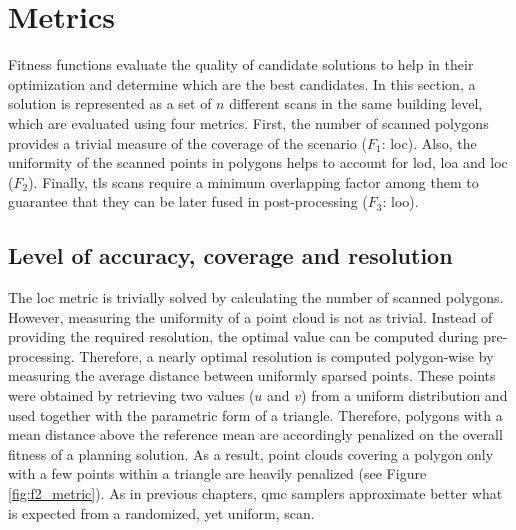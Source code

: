 \section{Metrics}

Fitness functions evaluate the quality of candidate solutions to help in their optimization and determine which are the best candidates. In this section, a solution is represented as a set of $n$ different scans in the same building level, which are evaluated using four metrics. First, the number of scanned polygons provides a trivial measure of the coverage of the scenario ($F_1$: \acrshort{loc}). Also, the uniformity of the scanned points in polygons helps to account for  \acrshort{lod}, \acrshort{loa} and \acrshort{loc} ($F_2$). Finally, \acrshort{tls} scans require a minimum overlapping factor among them to guarantee that they can be later fused in post-processing ($F_3$: \acrshort{loo}). 

\subsection{Level of accuracy, coverage and resolution}

The \acrshort{loc} metric is trivially solved by calculating the number of scanned polygons. However, measuring the uniformity of a point cloud is not as trivial. Instead of providing the required resolution, the optimal value can be computed during pre-processing. Therefore, a nearly optimal resolution is computed polygon-wise by measuring the average distance between uniformly sparsed points. These points were obtained by retrieving two values ($u$ and $v$) from a uniform distribution and used together with the parametric form of a triangle. Therefore, polygons with a mean distance above the reference mean are accordingly penalized on the overall fitness of a planning solution. As a result, point clouds covering a polygon only with a few points within a triangle are heavily penalized (see Figure \ref{fig:f2_metric}). As in previous chapters, \acrshort{qmc} samplers approximate better what is expected from a randomized, yet uniform, scan. 

